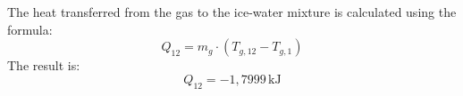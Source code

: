 The heat transferred from the gas to the ice-water mixture is calculated using the formula:  
\[
Q_{12} = m_g \cdot (T_{g,12} - T_{g,1})
\]  
The result is:  
\[
Q_{12} = -1,7999 \, \text{kJ}
\]